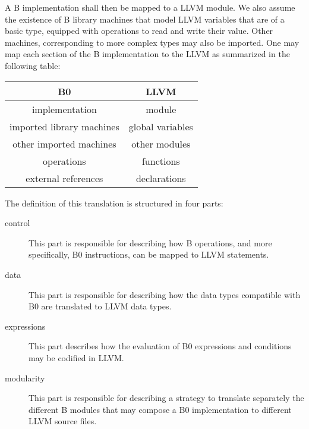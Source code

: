 \documentclass{article}
\begin{document}
A B implementation shall then be mapped to a LLVM module.  We also
assume the existence of B library machines that model LLVM variables
that are of a basic type, equipped with operations to read and write
their value.  Other machines, corresponding to more complex types may
also be imported. One may map each section of the B implementation to
the LLVM as summarized in the following table:

\begin{center}
  \begin{tabular}{|c|c|}
    \hline
    B0 & LLVM \\
    \hline
    \hline
    implementation & module \\
    \hline
    imported library machines & global variables \\
    \hline
    other imported machines & other modules \\
    \hline
    operations & functions \\
    \hline
    external references & declarations \\
    \hline
  \end{tabular}
\end{center}

The definition of this translation is structured in four parts:
\begin{description}
\item[control] This part is responsible for describing how B
  operations, and more specifically, B0 instructions, can be mapped to
  LLVM statements.
\item[data] This part is responsible for describing how the data types
  compatible with B0 are translated to LLVM data types.
\item[expressions] This part describes how the evaluation of B0
  expressions and conditions may be codified in LLVM.
\item[modularity] This part is responsible for describing a strategy
  to translate separately the different B modules that may compose a
  B0 implementation to different LLVM source files.
\end{description}
\end{document}
